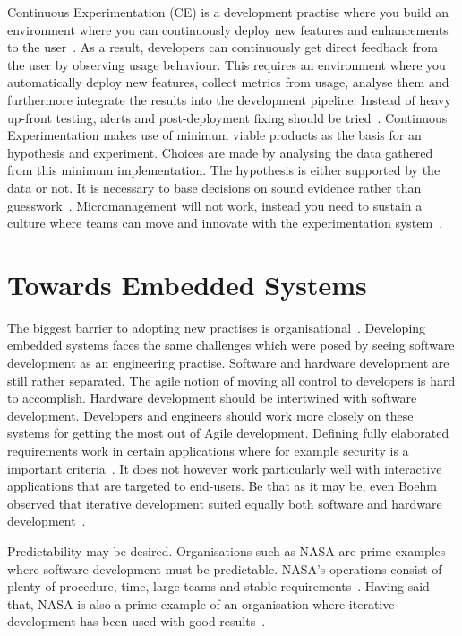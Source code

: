 \documentclass[english]{tktltiki2}
\begin{document}
Continuous Experimentation (CE) is a development practise where you build an environment where you can continuously deploy new features and enhancements to the user~\cite{FGM14}. As a result, developers can continuously get direct feedback from the user by observing usage behaviour. This requires an environment where you automatically deploy new features, collect metrics from usage, analyse them and furthermore integrate the results into the development pipeline. Instead of heavy up-front testing, alerts and post-deployment fixing should be tried~\cite{FGM14}. Continuous Experimentation makes use of minimum viable products as the basis for an hypothesis and experiment. Choices are made by analysing the data gathered from this minimum implementation. The hypothesis is either supported by the data or not. It is necessary to base decisions on sound evidence rather than guesswork~\cite{FGM14}. Micromanagement will not work, instead you need to sustain a culture where teams can move and innovate with the experimentation system~\cite{Rie11}.


\section{Towards Embedded Systems}

The biggest barrier to adopting new practises is organisational~\cite{Pop02}. Developing embedded systems faces the same challenges which were posed by seeing software development as an engineering practise. Software and hardware development are still rather separated. The agile notion of moving all control to developers is hard to accomplish. Hardware development should be intertwined with software development. Developers and engineers should work more closely on these systems for getting the most out of Agile development. Defining fully elaborated requirements work in certain applications where for example security is a important criteria~\cite{Boe88}. It does not however work particularly well with interactive applications that are targeted to end-users. Be that as it may be, even Boehm observed that iterative development suited equally both software and hardware development~\cite{Boe88}.

Predictability may be desired. Organisations such as NASA are prime examples where software development must be predictable. NASA’s operations consist of plenty of procedure, time, large teams and stable requirements~\cite{Fow05}. Having said that, NASA is also a prime example of an organisation where iterative development has been used with good results~\cite{LB03}.
\end{document}
